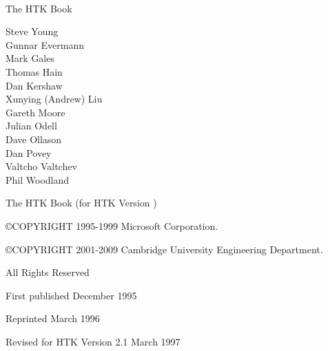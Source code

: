 \documentclass[a4paper,oneside]{book}
\begin{document}
\newlength{\saveindent}
\setlength{\saveindent}{\parindent}



{ \Large \ \\

\vspace{1cm}

\noindent The HTK Book

\vspace{1cm}

\noindent Steve Young \\
\noindent Gunnar Evermann \\
\noindent Mark Gales \\
\noindent Thomas Hain \\
\noindent Dan Kershaw \\
\noindent Xunying (Andrew) Liu \\
\noindent Gareth Moore \\
\noindent Julian Odell \\
\noindent Dave Ollason \\
\noindent Dan Povey \\
\noindent Valtcho Valtchev \\
\noindent Phil Woodland \\

\vspace{0.5cm}

\noindent The HTK Book (for HTK Version \version)

\vspace{1.0cm}

\noindent \copyright COPYRIGHT 1995-1999 Microsoft Corporation. 

\noindent \copyright COPYRIGHT 2001-2009 Cambridge University Engineering Department. 

\vspace{0.2cm}

\noindent All Rights Reserved

\vspace{0,5cm}

\noindent First published December 1995
\vspace{0.05cm}

\noindent Reprinted March 1996 
\vspace{0.05cm}

\noindent Revised for HTK Version 2.1 March 1997 
\vspace{0.05cm}

}
\end{document}
